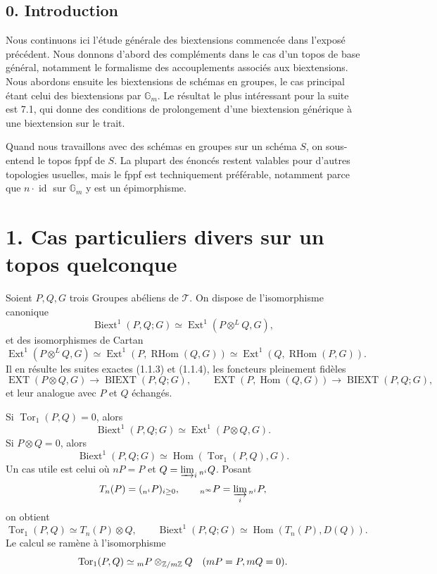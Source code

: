 \documentclass[11pt]{article}
\providecommand{\Gm}{\mathbb G_m}
\providecommand{\liminj}{\varinjlim}
\providecommand{\Hom}{\operatorname{Hom}}
\providecommand{\Ext}{\operatorname{Ext}}
\providecommand{\id}{\operatorname{id}}
\providecommand{\Biext}{\operatorname{Biext}}
\providecommand{\Ext}{\operatorname{Ext}}
\providecommand{\Torop}{\operatorname{Tor}}
\providecommand{\RHom}{\operatorname{RHom}}
\providecommand{\cT}{\mathcal T}
\begin{document}
\subsection*{0. Introduction}

Nous continuons ici l'étude générale des biextensions commencée dans l'exposé précédent.  Nous donnons d'abord des compléments dans le cas d'un topos de base général, notamment le formalisme des accouplements associés aux biextensions.  Nous abordons ensuite les biextensions de schémas en groupes, le cas principal étant celui des biextensions par \(\Gm\).  Le résultat le plus intéressant pour la suite est 7.1, qui donne des conditions de prolongement d'une biextension générique à une biextension sur le trait.

Quand nous travaillons avec des schémas en groupes sur un schéma \(S\), on sous-entend le topos fppf de \(S\).  La plupart des énoncés restent valables pour d'autres topologies usuelles, mais le fppf est techniquement préférable, notamment parce que \(n\cdot\id\) sur \(\Gm\) y est un épimorphisme.

\section*{1. Cas particuliers divers sur un topos quelconque}

Soient \(P,Q,G\) trois Groupes abéliens de \(\cT\).  On dispose de l'isomorphisme canonique
\[
        \Biext^1(P,Q;G)\simeq \Ext^1(P\otimes^L Q,G),
\]
et des isomorphismes de Cartan
\[
        \Ext^1(P\otimes^L Q,G)
        \simeq \Ext^1(P,\RHom(Q,G))
        \simeq \Ext^1(Q,\RHom(P,G)).
\]
Il en résulte les suites exactes (1.1.3) et (1.1.4), les foncteurs pleinement fidèles
\[
        \operatorname{EXT}(P\otimes Q,G)\to\operatorname{BIEXT}(P,Q;G),
        \qquad
        \operatorname{EXT}(P,\Hom(Q,G))\to\operatorname{BIEXT}(P,Q;G),
\]
et leur analogue avec \(P\) et \(Q\) échangés.

Si \(\Torop_1(P,Q)=0\), alors
\[
        \Biext^1(P,Q;G)\simeq\Ext^1(P\otimes Q,G).
\]
Si \(P\otimes Q=0\), alors
\[
        \Biext^1(P,Q;G)\simeq \Hom(\Torop_1(P,Q),G).
\]
Un cas utile est celui où \(nP=P\) et \(Q=\liminj_i {}_{n^i}Q\).  Posant
\[
        T_n(P)=({}_{n^i}P)_{i\ge0},
        \qquad {}_{n^\infty}P=\liminj_i {}_{n^i}P,
\]
on obtient
\[
        \Torop_1(P,Q)\simeq T_n(P)\otimes Q,
        \qquad
        \Biext^1(P,Q;G)\simeq \Hom(T_n(P),D(Q)).
\]
Le calcul se ramène à l'isomorphisme
\[
        \Torop_1(P,Q)\simeq {}_mP\otimes_{\mathbb Z/m\mathbb Z}Q
        \quad(mP=P,\\ mQ=0).
\]
\end{document}
